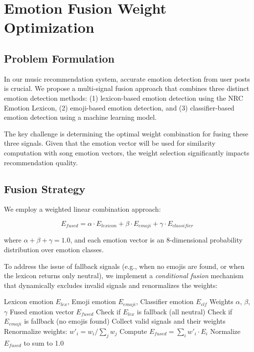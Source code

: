 
\section{Emotion Fusion Weight Optimization}
\label{sec:emotion_fusion_optimization}

\subsection{Problem Formulation}
\label{subsec:problem_formulation}

In our music recommendation system, accurate emotion detection from user posts is crucial. We propose a multi-signal fusion approach that combines three distinct emotion detection methods: (1) lexicon-based emotion detection using the NRC Emotion Lexicon, (2) emoji-based emotion detection, and (3) classifier-based emotion detection using a machine learning model. 

The key challenge is determining the optimal weight combination for fusing these three signals. Given that the emotion vector will be used for similarity computation with song emotion vectors, the weight selection significantly impacts recommendation quality.

\subsection{Fusion Strategy}
\label{subsec:fusion_strategy}

We employ a weighted linear combination approach:

\begin{equation}
E_{fused} = \alpha \cdot E_{lexicon} + \beta \cdot E_{emoji} + \gamma \cdot E_{classifier}
\end{equation}

where $\alpha + \beta + \gamma = 1.0$, and each emotion vector is an 8-dimensional probability distribution over emotion classes.

To address the issue of fallback signals (e.g., when no emojis are found, or when the lexicon returns only neutral), we implement a \textit{conditional fusion} mechanism that dynamically excludes invalid signals and renormalizes the weights:

\begin{algorithm}[h]
\caption{Conditional Emotion Fusion}
\begin{algorithmic}[1]
\Require Lexicon emotion $E_{lex}$, Emoji emotion $E_{emoji}$, Classifier emotion $E_{clf}$
\Require Weights $\alpha$, $\beta$, $\gamma$
\Ensure Fused emotion vector $E_{fused}$
\State Check if $E_{lex}$ is fallback (all neutral)
\State Check if $E_{emoji}$ is fallback (no emojis found)
\State Collect valid signals and their weights
\State Renormalize weights: $w'_i = w_i / \sum_j w_j$
\State Compute $E_{fused} = \sum_i w'_i \cdot E_i$
\State Normalize $E_{fused}$ to sum to 1.0
\end{algorithmic}
\end{algorithm}

